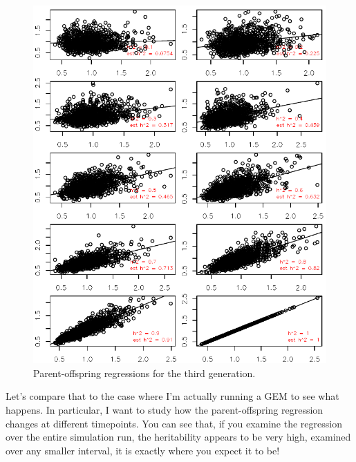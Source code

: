 \documentclass[12pt,reqno,final,pdftex]{amsart}\usepackage[]{graphicx}\usepackage[]{color}
\newenvironment{knitrout}{}{} %
\theoremstyle{plain}
\numberwithin{equation}{part}
\begin{document}
\begin{knitrout}\scriptsize
{}\color{fgcolor}\begin{figure}

\includegraphics[width=\linewidth]{figure/unnamed-chunk-4-1} \hfill{}

\caption[Parent-offspring regressions for the third generation]{Parent-offspring regressions for the third generation.}\label{fig:unnamed-chunk-4}
\end{figure}


\end{knitrout}

\newpage

Let's compare that to the case where I'm actually running a GEM to see what happens.
In particular, I want to study how the parent-offspring regression changes at different timepoints.
You can see that, if you examine the regression over the entire simulation run, the heritability appears to be very high, examined over any smaller interval, it is exactly where you expect it to be!
\end{document}
